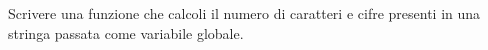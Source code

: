 Scrivere una funzione che calcoli il numero di caratteri e cifre presenti in una stringa passata come variabile
globale.
